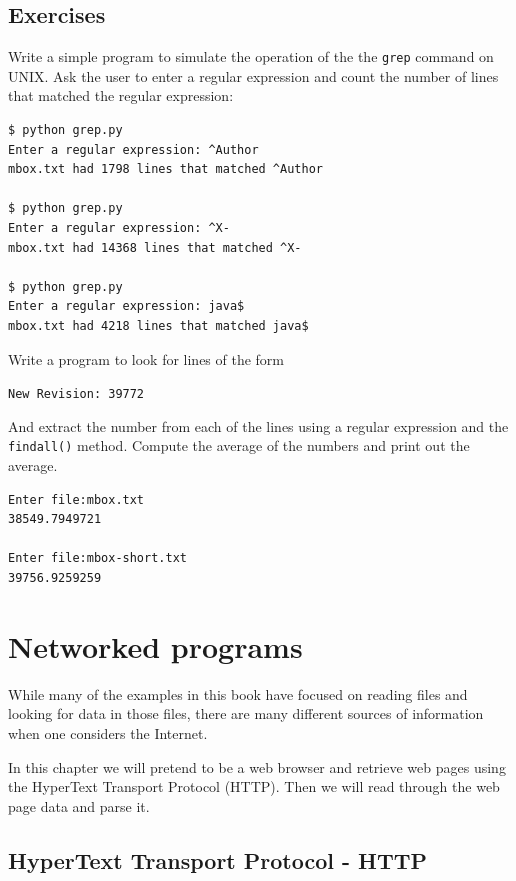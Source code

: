 \documentclass[11pt]{book}
\begin{document}
\section{Exercises}

\begin{ex}
Write a simple program to simulate the operation of the the {\tt grep} command 
on UNIX.  Ask the user to enter a regular expression and count the number
of lines that matched the regular expression:

\beforeverb
\begin{verbatim}
$ python grep.py
Enter a regular expression: ^Author
mbox.txt had 1798 lines that matched ^Author

$ python grep.py
Enter a regular expression: ^X-
mbox.txt had 14368 lines that matched ^X-

$ python grep.py
Enter a regular expression: java$
mbox.txt had 4218 lines that matched java$
\end{verbatim}
\afterverb
%
\end{ex}

\begin{ex}
Write a program to look for lines of the form

\verb"New Revision: 39772"

And extract the number from each of the lines using a regular expression
and the {\tt findall()} method.  Compute the average of the numbers and 
print out the average.

\beforeverb
\begin{verbatim}
Enter file:mbox.txt 
38549.7949721

Enter file:mbox-short.txt
39756.9259259
\end{verbatim}
\afterverb
%

\end{ex}

\chapter{Networked programs}

While many of the examples in this book have focused on reading
files and looking for data in those files, there are many different
sources of information when one considers the Internet.

In this chapter we will pretend to be a web browser and retrieve web
pages using the HyperText Transport Protocol (HTTP).  Then we will read
through the web page data and parse it.

\section{HyperText Transport Protocol - HTTP}
\end{document}
